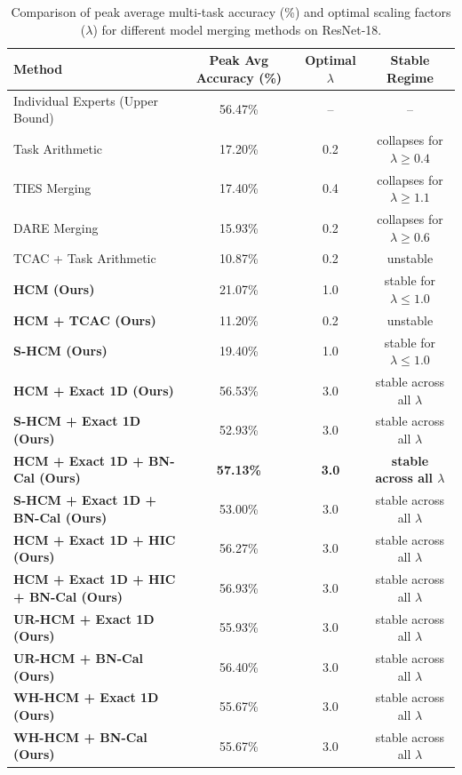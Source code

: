 \documentclass{article}
\begin{document}
\begin{table}[t]
\caption{Comparison of peak average multi-task accuracy (\%) and optimal scaling factors ($\lambda$) for different model merging methods on ResNet-18.}
\label{tab:results}
\vskip 0.15in
\begin{center}
\begin{small}
\begin{sc}
\begin{tabular}{lccc}
\toprule
Method & Peak Avg Accuracy (\%) & Optimal $\lambda$ & Stable Regime \\
\midrule
Individual Experts (Upper Bound) & 56.47\% & -- & -- \\
Task Arithmetic & 17.20\% & 0.2 & collapses for $\lambda \ge 0.4$ \\
TIES Merging & 17.40\% & 0.4 & collapses for $\lambda \ge 1.1$ \\
DARE Merging & 15.93\% & 0.2 & collapses for $\lambda \ge 0.6$ \\
TCAC + Task Arithmetic & 10.87\% & 0.2 & unstable \\
\midrule
\textbf{HCM (Ours)} & 21.07\% & 1.0 & stable for $\lambda \le 1.0$ \\
\textbf{HCM + TCAC (Ours)} & 11.20\% & 0.2 & unstable \\
\textbf{S-HCM (Ours)} & 19.40\% & 1.0 & stable for $\lambda \le 1.0$ \\
\textbf{HCM + Exact 1D (Ours)} & 56.53\% & 3.0 & stable across all $\lambda$ \\
\textbf{S-HCM + Exact 1D (Ours)} & 52.93\% & 3.0 & stable across all $\lambda$ \\
\textbf{HCM + Exact 1D + BN-Cal (Ours)} & \textbf{57.13\%} & \textbf{3.0} & \textbf{stable across all $\lambda$} \\
\textbf{S-HCM + Exact 1D + BN-Cal (Ours)} & 53.00\% & 3.0 & stable across all $\lambda$ \\
\textbf{HCM + Exact 1D + HIC (Ours)} & 56.27\% & 3.0 & stable across all $\lambda$ \\
\textbf{HCM + Exact 1D + HIC + BN-Cal (Ours)} & 56.93\% & 3.0 & stable across all $\lambda$ \\
\midrule
\textbf{UR-HCM + Exact 1D (Ours)} & 55.93\% & 3.0 & stable across all $\lambda$ \\
\textbf{UR-HCM + BN-Cal (Ours)} & 56.40\% & 3.0 & stable across all $\lambda$ \\
\textbf{WH-HCM + Exact 1D (Ours)} & 55.67\% & 3.0 & stable across all $\lambda$ \\
\textbf{WH-HCM + BN-Cal (Ours)} & 55.67\% & 3.0 & stable across all $\lambda$ \\
\bottomrule
\end{tabular}
\end{sc}
\end{small}
\end{center}
\vskip -0.1in
\end{table}
\end{document}
